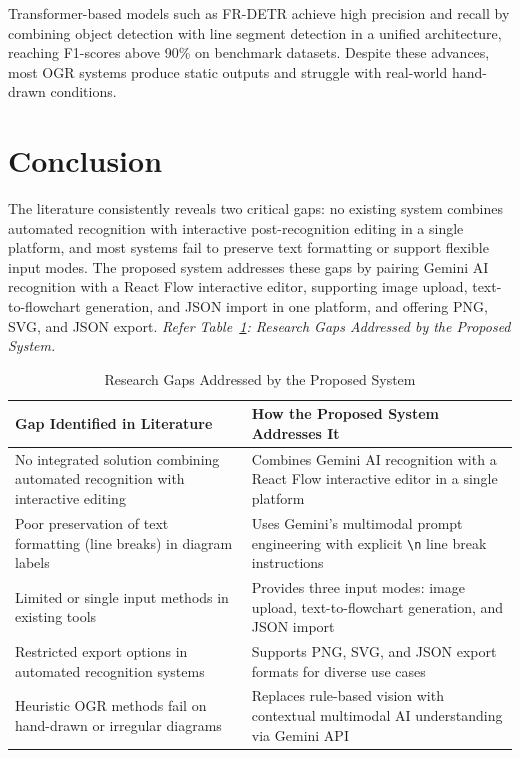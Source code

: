 Transformer-based models such as FR-DETR achieve high 
precision and recall by combining object detection with line 
segment detection in a unified architecture, reaching F1-scores 
above 90\% on benchmark datasets. Despite these advances, most OGR systems produce static outputs and struggle with real-world hand-drawn conditions.~\cite{diagram-survey}

\section{Conclusion}
\label{sec:lit-conclusion}

The literature consistently reveals two critical gaps: no existing system combines automated recognition with interactive post-recognition editing in a single platform, and most systems fail to preserve text formatting or support flexible input modes. The proposed system addresses these gaps by pairing Gemini AI recognition with a React Flow interactive editor, supporting image upload, text-to-flowchart generation, and JSON import in one platform, and offering PNG, SVG, and JSON export. \textit{Refer Table~\ref{tab:gap_analysis}: Research Gaps Addressed by the Proposed System.}

\vspace{1em}
\begin{table}[htbp]
\centering
\renewcommand{\arraystretch}{1.5}
\begin{tabular}{|p{6cm}|p{6cm}|}
\hline
\textbf{Gap Identified in Literature} & \textbf{How the Proposed System Addresses It} \\
\hline
No integrated solution combining automated recognition with interactive editing &
Combines Gemini AI recognition with a React Flow interactive editor in a single platform \\
\hline
Poor preservation of text formatting (line breaks) in diagram labels &
Uses Gemini's multimodal prompt engineering with explicit \texttt{\textbackslash n} line break instructions \\
\hline
Limited or single input methods in existing tools &
Provides three input modes: image upload, text-to-flowchart generation, and JSON import \\
\hline
Restricted export options in automated recognition systems &
Supports PNG, SVG, and JSON export formats for diverse use cases \\
\hline
Heuristic OGR methods fail on hand-drawn or irregular diagrams &
Replaces rule-based vision with contextual multimodal AI understanding via Gemini API \\
\hline
\end{tabular}
\caption{Research Gaps Addressed by the Proposed System}
\label{tab:gap_analysis}
\end{table}
